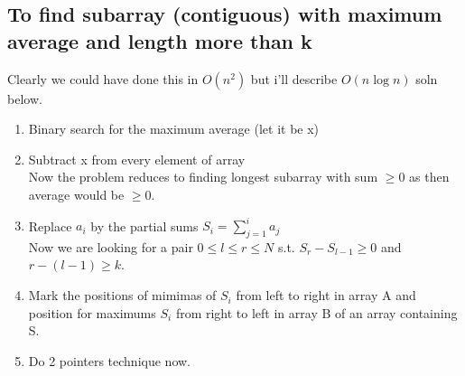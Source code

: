 \documentclass[8pt, a4paper, oneside, twocolumn]{extarticle}
\begin{document}
\subsection{To find subarray (contiguous) with maximum average and length more than \textbf{k}}
Clearly we could have done this in $O(n^2)$ but i'll describe $O(n \log n)$ soln below.
\begin{enumerate}
    \item Binary search for the maximum average (let it be x)
    \item Subtract x from every element of array
\\Now the problem reduces to finding longest subarray with sum $\geq 0$ as then average would be $\geq 0$.
    \item Replace $a_i$ by the partial sums $S_i = \sum_{j = 1}^i a_j$\\
Now we are looking for a pair $0 \leq l \leq r \leq N$ s.t. $S_r - S_{l - 1} \geq 0$ and $r - (l - 1) \geq k$.
    \item Mark the positions of mimimas of $S_i$ from left to right in array A and position for maximums $S_i$ from right to left in array B of an array containing S.
    \item Do 2 pointers technique now.
\end{enumerate}
\end{document}

